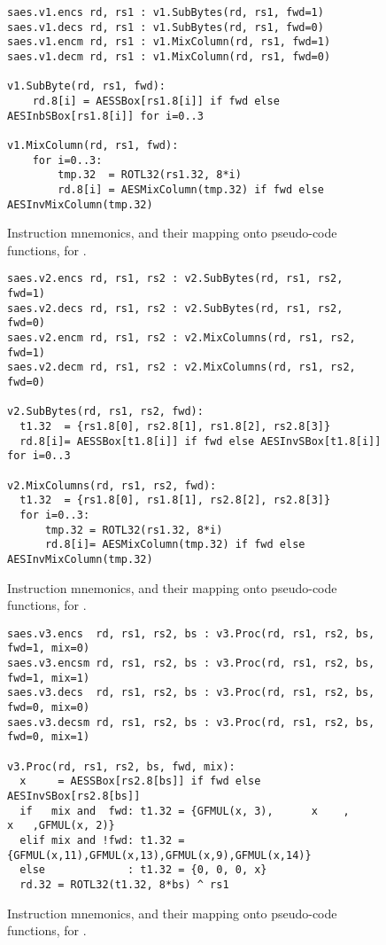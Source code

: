 
\begin{figure}[!h]
\begin{lstlisting}[language=pseudo,style=block]
saes.v1.encs rd, rs1 : v1.SubBytes(rd, rs1, fwd=1)
saes.v1.decs rd, rs1 : v1.SubBytes(rd, rs1, fwd=0)
saes.v1.encm rd, rs1 : v1.MixColumn(rd, rs1, fwd=1)
saes.v1.decm rd, rs1 : v1.MixColumn(rd, rs1, fwd=0)

v1.SubByte(rd, rs1, fwd):
    rd.8[i] = AESSBox[rs1.8[i]] if fwd else AESInbSBox[rs1.8[i]] for i=0..3

v1.MixColumn(rd, rs1, fwd):
    for i=0..3:
        tmp.32  = ROTL32(rs1.32, 8*i)
        rd.8[i] = AESMixColumn(tmp.32) if fwd else AESInvMixColumn(tmp.32)
\end{lstlisting}
\caption{
  Instruction mnemonics, and their mapping onto pseudo-code functions, for .
}
\label{fig:v1:pseudo}
\end{figure}

\begin{figure}[!h]
\begin{lstlisting}[language=pseudo,style=block]
saes.v2.encs rd, rs1, rs2 : v2.SubBytes(rd, rs1, rs2, fwd=1)
saes.v2.decs rd, rs1, rs2 : v2.SubBytes(rd, rs1, rs2, fwd=0)
saes.v2.encm rd, rs1, rs2 : v2.MixColumns(rd, rs1, rs2, fwd=1)
saes.v2.decm rd, rs1, rs2 : v2.MixColumns(rd, rs1, rs2, fwd=0)

v2.SubBytes(rd, rs1, rs2, fwd):
  t1.32  = {rs1.8[0], rs2.8[1], rs1.8[2], rs2.8[3]}
  rd.8[i]= AESSBox[t1.8[i]] if fwd else AESInvSBox[t1.8[i]] for i=0..3

v2.MixColumns(rd, rs1, rs2, fwd):
  t1.32  = {rs1.8[0], rs1.8[1], rs2.8[2], rs2.8[3]}
  for i=0..3:
      tmp.32 = ROTL32(rs1.32, 8*i)
      rd.8[i]= AESMixColumn(tmp.32) if fwd else AESInvMixColumn(tmp.32)
\end{lstlisting}
\caption{
  Instruction mnemonics, and their mapping onto pseudo-code functions, for .
}
\label{fig:v2:pseudo}
\end{figure}

\begin{figure}[!h]
\begin{lstlisting}[language=pseudo,style=block]
saes.v3.encs  rd, rs1, rs2, bs : v3.Proc(rd, rs1, rs2, bs, fwd=1, mix=0)
saes.v3.encsm rd, rs1, rs2, bs : v3.Proc(rd, rs1, rs2, bs, fwd=1, mix=1)
saes.v3.decs  rd, rs1, rs2, bs : v3.Proc(rd, rs1, rs2, bs, fwd=0, mix=0)
saes.v3.decsm rd, rs1, rs2, bs : v3.Proc(rd, rs1, rs2, bs, fwd=0, mix=1)

v3.Proc(rd, rs1, rs2, bs, fwd, mix):
  x     = AESSBox[rs2.8[bs]] if fwd else AESInvSBox[rs2.8[bs]]
  if   mix and  fwd: t1.32 = {GFMUL(x, 3),      x    ,      x   ,GFMUL(x, 2)}
  elif mix and !fwd: t1.32 = {GFMUL(x,11),GFMUL(x,13),GFMUL(x,9),GFMUL(x,14)}
  else             : t1.32 = {0, 0, 0, x}
  rd.32 = ROTL32(t1.32, 8*bs) ^ rs1
\end{lstlisting}
\caption{
  Instruction mnemonics, and their mapping onto pseudo-code functions, for .
}
\label{fig:v3:pseudo}
\end{figure}

